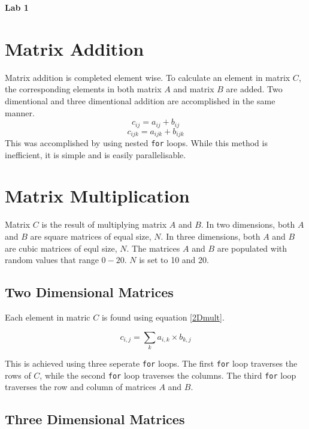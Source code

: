 \documentclass[a4paper,10pt]{article}
\begin{document}
{\LARGE{\centerline{\bf Lab 1}}}

\section{Matrix Addition}
Matrix addition is completed element wise. To calculate an element in matrix $C$, the corresponding elements in both matrix $A$ and matrix $B$ are added. Two dimentional and three dimentional addition are accomplished in the same manner.
\begin{equation}
	c_{ij} = a_{ij}+b_{ij}
\end{equation}
\begin{equation}
	c_{ijk} = a_{ijk}+b_{ijk}
\end{equation}
This was accomplished by using nested \texttt{for} loops. While this method is inefficient, it is simple and is easily parallelisable.


\section{Matrix Multiplication}

Matrix $C$ is the result of multiplying matrix $A$ and $B$.
In two dimensions, both $A$ and $B$ are square matrices of equal size, $N$.
In three dimensions, both $A$ and $B$ are cubic matrices of equl size, $N$.
The matrices $A$ and $B$ are populated with random values that range $0 - 20$.
$N$ is set to 10 and 20.

\subsection{Two Dimensional Matrices}

Each element in matric $C$ is found using equation \ref{2Dmult}.

\begin{equation}\label{2Dmult}
c_{i,j}=\sum_{k} a_{i,k} \times b_{k,j}
\end{equation}

This is achieved using three seperate \texttt{for} loops.
The first \texttt{for} loop traverses the rows of $C$, while the second \texttt{for} loop traverses the columns.
The third \texttt{for} loop traverses the row and column of matrices $A$ and $B$.

\subsection{Three Dimensional Matrices}
\end{document}
